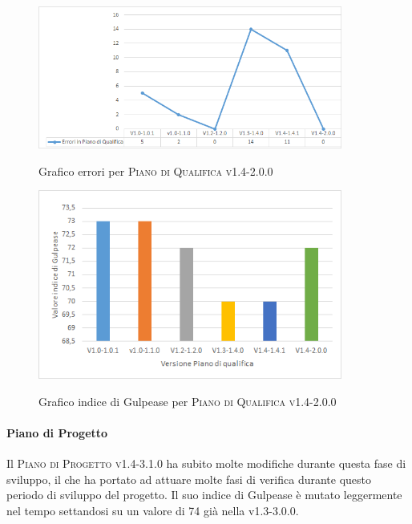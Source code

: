 \documentclass[../piano-di-qualifica.tex]{subfiles}
\begin{document}
\begin{figure}[H]
  \centering
  \includegraphics[width=10cm]{img/erroriPdQV1.4-2.0.0.png}
  \label{fig:errori_pdq}
  \caption{Grafico errori per \textsc{Piano di Qualifica v1.4-2.0.0}}
\end{figure}

\begin{figure}[H]
  \centering
  \includegraphics[width=10cm]{img/GulpeasePdQV1.4-2.0.0.png}
  \label{fig:gulpease_pdq}
  \caption{Grafico indice di Gulpease per \textsc{Piano di Qualifica v1.4-2.0.0}}
\end{figure}


\paragraph{Piano di Progetto}
\label{sub:piano_di_progetto}
Il \textsc{Piano di Progetto v1.4-3.1.0} ha subito molte modifiche durante questa fase di sviluppo, il che ha portato ad attuare molte fasi di verifica durante questo periodo di sviluppo del progetto.
Il suo indice di Gulpease è mutato leggermente nel tempo settandosi su un valore di 74 già nella v1.3-3.0.0.
\end{document}

